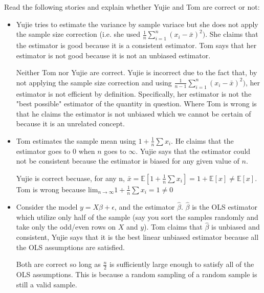 \documentclass[11pt]{SelfArxOneColBMN}
\affiliation{\textsuperscript{1}\textit{John E. Walker Department of Economics,
Clemson University,Clemson, SC: email ijdavis@g.clemson.edu}}
\date{\small{Version ~\today}}
\begin{document}
\flushbottom

\maketitle

\begin{exercise}
	Read the following stories and explain whether Yujie and Tom are correct or not:
	\begin{itemize}
		\item Yujie tries to estimate the variance by sample variace but she does not apply the sample size correction (i.e. she used $\frac{1}{n}\sum_{i=1}^{n}(x_i - \bar{x})^2)$. She claims that the estimator is good because it is a consistent estimator. Tom says that her estimator is not good because it is not an unbiased estimator.
		\begin{solution}
			Neither Tom nor Yujie are correct. Yujie is incorrect due to the fact that, by not applying the sample size correction and using $\frac{1}{n- 1}\sum_{i=1}^{n}(x_i - \bar{x})^2)$, her estimator is not efficient by definition. Specifically, her estimator is not the "best possible" estimator of the quantity in question. Where Tom is wrong is that he claims the estimator is not unbiased which we cannot be certain of because it is an unrelated concept.
		\end{solution}
		\item Tom estimates the sample mean using $1 + \frac{1}{n}\sum x_i$. He claims that the estimator goes to 0 when $n$ goes to $\infty$. Yujie says that the estimator could not be consistent because the estimator is biased for any given value of $n$.
		\begin{solution}
			Yujie is correct becuase, for any n, $\bar{x} = \mathbb{E}[1 + \frac{1}{n}\sum x_i] = 1 + \mathbb{E}[x] \neq \mathbb{E}[x]$. Tom is wrong because $\text{lim}_{n \rightarrow \infty} 1 + \frac{1}{n}\sum x_i = 1 \neq 0$
		\end{solution}
		\item Consider the model $y = X\beta +  \epsilon$, and the estimator $\hat{\beta}$. $\hat{\beta}$ is the OLS estimator which utilize only half of the sample (say you sort the samples randomly and take only the odd/even rows on $X$ and $y$). Tom claims that $\hat{\beta}$ is unbiased and consistent, Yujie says that it is the best linear unbiased estimator because all the OLS assumptions are satisfied.
		\begin{solution}
			Both are correct so long as $\frac{n}{2}$ is sufficiently large enough to satisfy all of the OLS assumptions. This is because a random sampling of a random sample is still a valid sample. 

\end{solution}
\end{itemize}
\end{exercise}
\end{document}
